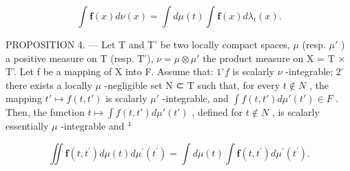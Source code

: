 \[
\int \mathbf {f} (x) d \nu (x) = \int d \mu (t) \int \mathbf {f} (x) d \lambda_ {t} (x).
\]

PROPOSITION 4. --- Let T and T' be two locally compact spaces, \(\mu\) (resp. \(\mu'\) ) a positive measure on T (resp. T'), \(\nu = \mu \otimes \mu'\) the product measure on X = T × T'. Let f be a mapping of X into F. Assume that: \(1^{\circ} f\) is scalarly \(\nu\) -integrable; \(2^{\circ}\) there exists a locally \(\mu\) -negligible set N ⊂ T such that, for every \(t \notin N\) , the mapping \(t' \mapsto f(t, t')\) is scalarly \(\mu'\) -integrable, and \(\int f(t, t') d\mu'(t') \in F\) . Then, the function \(t \mapsto \int f(t, t') d\mu'(t')\) , defined for \(t \notin N\) , is scalarly essentially \(\mu\) -integrable and \(^{4}\)

\[
\iint \mathbf {f} (t, t ^ {\prime}) d \mu (t) d \mu^ {\prime} (t ^ {\prime}) = \int d \mu (t) \int \mathbf {f} (t, t ^ {\prime}) d \mu^ {\prime} (t ^ {\prime}).
\]

